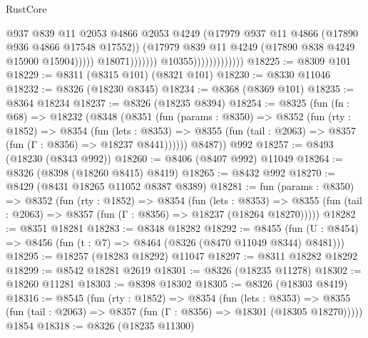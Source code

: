 \begin{lexlean}{RustCore}
\begin{coremodule}
                                                  @937
                                                  @839
                                                  @11
                                                  @2053
                                                  @4866
                                                  @2053
                                                  @4249
                                                  (@17979
                                                    @937
                                                    @11
                                                    @4866
                                                    (@17890 @936 @4866 @17548 @17552))
                                                  (@17979
                                                    @839
                                                    @11
                                                    @4249
                                                    (@17890 @838 @4249 @15900 @15904)))))
                                            @18071)))))))
                              @10355)))))))))))))
@18225 := @8309 @101
@18229 := @8311 (@8315 @101) (@8321 @101)
@18230 := @8330 @11046
@18232 := @8326 (@18230 @8345)
@18234 := @8368 (@8369 @101)
@18235 := @8364 @18234
@18237 := @8326 (@18235 @8394)
@18254 := @8325
    (fun (fn : @68) =>
    @18232
      (@8348
        (@8351
          (fun (params : @8350) =>
          @8352
            (fun (rty : @1852) =>
            @8354
              (fun (lets : @8353) =>
              @8355 (fun (tail : @2063) => @8357 (fun (Γ : @8356) => @18237 @8441))))))
        @8487))
    @992
@18257 := @8493 (@18230 (@8343 @992))
@18260 := @8406 (@8407 @992) @11049
@18264 := @8326 (@8398 (@18260 @8415) @8419)
@18265 := @8432 @992
@18270 := @8429 (@8431 @18265 @11052 @8387 @8389)
@18281 := fun (params : @8350) =>
  @8352
    (fun (rty : @1852) =>
    @8354
      (fun (lets : @8353) =>
      @8355 (fun (tail : @2063) => @8357 (fun (Γ : @8356) => @18237 (@18264 @18270)))))
@18282 := @8351 @18281
@18283 := @8348 @18282
@18292 := @8455
    (fun (U : @8454) => @8456 (fun (t : @7) => @8464 (@8326 (@8470 @11049 @8344) @8481)))
@18295 := @18257 (@18283 @18292) @11047
@18297 := @8311 @18282 @18292
@18299 := @8542 @18281 @2619
@18301 := @8326 (@18235 @11278)
@18302 := @18260 @11281
@18303 := @8398 @18302
@18305 := @8326 (@18303 @8419)
@18316 := @8545
    (fun (rty : @1852) =>
    @8354
      (fun (lets : @8353) =>
      @8355 (fun (tail : @2063) => @8357 (fun (Γ : @8356) => @18301 (@18305 @18270)))))
    @1854
@18318 := @8326 (@18235 @11300)

\end{coremodule}
\end{lexlean}
